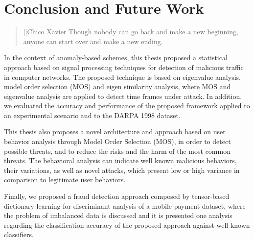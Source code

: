 \chapter{Conclusion and Future Work}
\label{ch:5_conclusionfuturework}

\begin{quotation}[]{Chico Xavier}
Though nobody can go back and make a new beginning, anyone can start over and make a new ending.
\end{quotation}


In the context of anomaly-based schemes, this thesis proposed a statistical approach based on signal processing techniques for detection of malicious traffic in computer networks. The proposed technique is based on eigenvalue analysis, model order selection (MOS) and eigen similarity analysis, where MOS and eigenvalue analysis are applied to detect time frames under attack. In addition, we evaluated the accuracy and performance of the proposed framework applied to an experimental scenario and to the DARPA 1998 dataset. 

This thesis also proposes a novel architecture and approach based on user behavior analysis through Model Order Selection (MOS), in order to detect possible threats, and to reduce the risks and the harm of the most common threats. The behavioral analysis can indicate well known malicious behaviors, their variations, as well as novel attacks, which present low or high variance in comparison to legitimate user behaviors. 

Finally, we proposed a fraud detection approach composed by tensor-based dictionary learning for discriminant analysis of a mobile payment dataset, where the problem of imbalanced data is discussed and it is presented one analysis regarding the classification accuracy of the proposed approach against well known classifiers.


